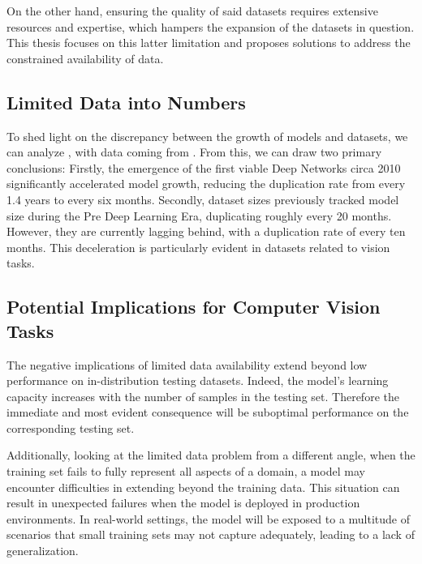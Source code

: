 On the other hand, ensuring the quality of said datasets requires extensive resources and expertise, which hampers the expansion of the datasets in question. This thesis focuses on this latter limitation and proposes solutions to address the constrained availability of data.

\subsection{Limited Data into Numbers}
To shed light on the discrepancy between the growth of models and datasets, we can analyze , with data coming from . From this, we can draw two primary conclusions: Firstly, the emergence of the first viable Deep Networks circa 2010 significantly accelerated model growth, reducing the duplication rate from every 1.4 years to every six months. Secondly, dataset sizes previously tracked model size during the Pre Deep Learning Era, duplicating roughly every 20 months. However, they are currently lagging behind, with a duplication rate of every ten months. This deceleration is particularly evident in datasets related to vision tasks.

\subsection{Potential Implications for Computer Vision Tasks}
The negative implications of limited data availability extend beyond low performance on in-distribution testing datasets. Indeed, the model's learning capacity increases with the number of samples in the testing set. Therefore the immediate and most evident consequence will be suboptimal performance on the corresponding testing set.

Additionally, looking at the limited data problem from a different angle, when the training set fails to fully represent all aspects of a domain, a model may encounter difficulties in extending beyond the training data. This situation can result in unexpected failures when the model is deployed in production environments. In real-world settings, the model will be exposed to a multitude of scenarios that small training sets may not capture adequately, leading to a lack of generalization.

